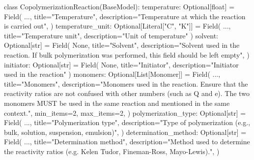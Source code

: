 \documentclass[
  letterpaper,
  DIV=11,
  numbers=noendperiod]{scrreprt}
\newenvironment{Shaded}{\begin{snugshade}}{\end{snugshade}}
\newcommand{\BuiltInTok}[1]{\textcolor[rgb]{0.00,0.23,0.31}{#1}}
\newcommand{\DecValTok}[1]{\textcolor[rgb]{0.68,0.00,0.00}{#1}}
\newcommand{\KeywordTok}[1]{\textcolor[rgb]{0.00,0.23,0.31}{#1}}
\newcommand{\NormalTok}[1]{\textcolor[rgb]{0.00,0.23,0.31}{#1}}
\newcommand{\OperatorTok}[1]{\textcolor[rgb]{0.37,0.37,0.37}{#1}}
\newcommand{\StringTok}[1]{\textcolor[rgb]{0.13,0.47,0.30}{#1}}
\newcommand{\VariableTok}[1]{\textcolor[rgb]{0.07,0.07,0.07}{#1}}
\begin{document}
\begin{Shaded}
\begin{Highlighting}[]
\KeywordTok{class}\NormalTok{ CopolymerizationReaction(BaseModel):}
\NormalTok{    temperature: Optional[}\BuiltInTok{float}\NormalTok{] }\OperatorTok{=}\NormalTok{ Field(}
\NormalTok{        ...,}
\NormalTok{        title}\OperatorTok{=}\StringTok{"Temperature"}\NormalTok{,}
\NormalTok{        description}\OperatorTok{=}\StringTok{"Temperature at which the reaction is carried out"}\NormalTok{,}
\NormalTok{    )}
\NormalTok{    temperature\_unit: Optional[Literal[}\StringTok{"C"}\NormalTok{, }\StringTok{"K"}\NormalTok{]] }\OperatorTok{=}\NormalTok{ Field(}
\NormalTok{        ..., title}\OperatorTok{=}\StringTok{"Temperature unit"}\NormalTok{, description}\OperatorTok{=}\StringTok{"Unit of temperature"}
\NormalTok{    )}
\NormalTok{    solvent: Optional[}\BuiltInTok{str}\NormalTok{] }\OperatorTok{=}\NormalTok{ Field(}
        \VariableTok{None}\NormalTok{,}
\NormalTok{        title}\OperatorTok{=}\StringTok{"Solvent"}\NormalTok{,}
\NormalTok{        description}\OperatorTok{=}\StringTok{"Solvent used in the reaction. If bulk polymerization was performed, this field should be left empty"}\NormalTok{,}
\NormalTok{    )}
\NormalTok{    initiator: Optional[}\BuiltInTok{str}\NormalTok{] }\OperatorTok{=}\NormalTok{ Field(}
        \VariableTok{None}\NormalTok{, title}\OperatorTok{=}\StringTok{"Initiator"}\NormalTok{, description}\OperatorTok{=}\StringTok{"Initiator used in the reaction"}
\NormalTok{    )}
\NormalTok{    monomers: Optional[List[Monomer]] }\OperatorTok{=}\NormalTok{ Field(}
\NormalTok{        ...,}
\NormalTok{        title}\OperatorTok{=}\StringTok{"Monomers"}\NormalTok{,}
\NormalTok{        description}\OperatorTok{=}\StringTok{"Monomers used in the reaction. Ensure that the reactivity ratios are not confused with other numbers (such as Q and e). The two monomers MUST be used in the same reaction and mentioned in the same context."}\NormalTok{,}
\NormalTok{        min\_items}\OperatorTok{=}\DecValTok{2}\NormalTok{,}
\NormalTok{        max\_items}\OperatorTok{=}\DecValTok{2}\NormalTok{,}
\NormalTok{    )}
\NormalTok{    polymerization\_type: Optional[}\BuiltInTok{str}\NormalTok{] }\OperatorTok{=}\NormalTok{ Field(}
\NormalTok{        ...,}
\NormalTok{        title}\OperatorTok{=}\StringTok{"Polymerization type"}\NormalTok{,}
\NormalTok{        description}\OperatorTok{=}\StringTok{"Type of polymerization (e.g., bulk, solution, suspension, emulsion)"}\NormalTok{,}
\NormalTok{    )}
\NormalTok{    determination\_method: Optional[}\BuiltInTok{str}\NormalTok{] }\OperatorTok{=}\NormalTok{ Field(}
\NormalTok{        ...,}
\NormalTok{        title}\OperatorTok{=}\StringTok{"Determination method"}\NormalTok{,}
\NormalTok{        description}\OperatorTok{=}\StringTok{"Method used to determine the reactivity ratios (e.g. Kelen Tudor, Fineman{-}Ross, Mayo{-}Lewis)."}\NormalTok{,}
\NormalTok{    )}
       
\end{Highlighting}
\end{Shaded}
\end{document}
